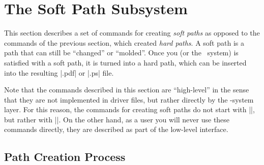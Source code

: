 %
%
%


\section[pgfsys-paths]{The Soft Path Subsystem}
\label{section-soft-paths}

\makeatletter

This section describes a set of commands for creating \emph{soft paths} as
opposed to the commands of the previous section, which created \emph{hard
paths}. A soft path is a path that can still be ``changed'' or ``molded''. Once
you (or the \pgfname\ system) is satisfied with a soft path, it is turned into
a hard path, which can be inserted into the resulting |.pdf| or |.ps| file.

Note that the commands described in this section are ``high-level'' in the
sense that they are not implemented in driver files, but rather directly by the
\pgfname-system layer. For this reason, the commands for creating soft paths do
not start with |\pgfsys@|, but rather with |\pgfsyssoftpath@|. On the other
hand, as a user you will never use these commands directly, they are described
as part of the low-level interface.


\subsection{Path Creation Process}

